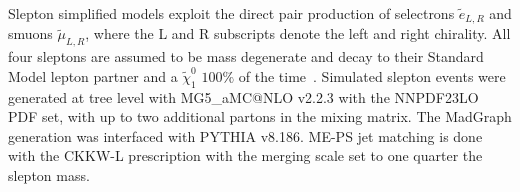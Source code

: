  \iffalse
   \begin{figure}[tbp]
     \texttt{[image: /Users/sheenaschier/Documents/LaFiles/figures/thesis/signal\_samples/ossf\_MET.pdf]}      
      \texttt{[image: /Users/sheenaschier/Documents/LaFiles/figures/thesis/signal\_samples/ossf\_dphi\_j1met.pdf]}
     \texttt{[image: /Users/sheenaschier/Documents/LaFiles/figures/thesis/signal\_samples/ossf\_Jet1Pt.pdf]}
\caption{Jet and \met{} kinematics in electroweakino signal samples, with decays simulated with MadSpin and parton showing performed by Pythia v8.186.}
   \label{fig:SigSample2}
 \end{figure}
 \fi

 
Slepton simplified models exploit the direct pair production of selectrons $\tilde{e}_{L,R}$ and smuons $\tilde{\mu}_{L,R}$, where the L and R subscripts denote the left and right chirality.  All four sleptons are assumed to be mass degenerate and decay to their Standard Model lepton partner and a $\tilde\chi_1^0$ $100\%$ of the time~\cite{Ajaib:2015yma}.  Simulated slepton events were generated at tree level with MG5\_aMC@NLO v2.2.3 with the NNPDF23LO PDF set, with up to two additional partons in the mixing matrix.  The MadGraph generation was interfaced with PYTHIA v8.186.  ME-PS jet matching is done with the CKKW-L prescription with the merging scale set to one quarter the slepton mass.
 \FloatBarrier

 \iffalse
\begin{figure}[tbp]
    \centering
 \texttt{[image: /Users/sheenaschier/Documents/LaFiles/figures/thesis/signal\_samples/mll\_theory.pdf]}
 \caption{Dilepton invariant mass distributions simulated with Higgsino (blue) and wino/bino (red) simplified models.  In both models, $m(\chi_2^0, \chi_1^0$ = ($100, 80$) GeV.}
\label{fig:samples:invMass}
\end{figure}
\fi
 \FloatBarrier
 
